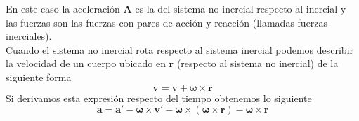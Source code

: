 \documentclass[a4paper]{article}
\numberwithin{equation}{section}
\begin{document}
            En este caso la aceleración $\boldsymbol{A}$ es la del sistema no inercial respecto al inercial y las fuerzas son las fuerzas con pares de acción y reacción (llamadas fuerzas inerciales).\\
            Cuando el sistema no inercial rota respecto al sistema inercial podemos describir la velocidad de un cuerpo ubicado en $\boldsymbol{r}$ (respecto al sistema no inercial) de la siguiente forma
            \begin{equation}
                \boldsymbol{v} = \boldsymbol{v} + \boldsymbol{\omega} \times \boldsymbol{r}
            \end{equation}
            Si derivamos esta expresión respecto del tiempo obtenemos lo siguiente
            \begin{equation}
                \boldsymbol{a} = \boldsymbol{a}' - \boldsymbol{\omega} \times \boldsymbol{v}' - \boldsymbol{\omega} \times (\boldsymbol{\omega} \times \boldsymbol{r}) - \dot{\boldsymbol{\omega}} \times \boldsymbol{r}
                \label{eq:sni_rot}
            \end{equation}
\end{document}
